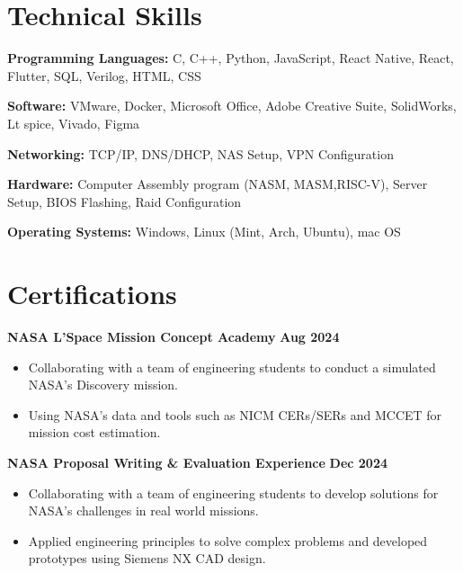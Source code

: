 \documentclass[letterpaper,11pt]{article}
\begin{document}
\section{Technical Skills}
\begin{itemize}[left=0.15in, label={}]
    \small{
    \item \textbf{Programming Languages:} C, C++, Python, JavaScript, React Native, React, Flutter, SQL, Verilog, HTML, CSS
    \item \textbf{Software:} VMware, Docker, Microsoft Office, Adobe Creative Suite, SolidWorks, Lt spice, Vivado, Figma
    \item \textbf{Networking:} TCP/IP, DNS/DHCP, NAS Setup, VPN Configuration
    \item \textbf{Hardware:} Computer Assembly program (NASM, MASM,RISC-V), Server Setup, BIOS Flashing, Raid Configuration
    \item \textbf{Operating Systems:} Windows, Linux (Mint, Arch, Ubuntu), mac OS
    }
\end{itemize}

\section{Certifications}
\textbf{NASA L’Space Mission Concept Academy}  \hfill \textbf{Aug 2024} 
\begin{itemize}[leftmargin=0.15in, label={$\bullet$}]
    \item Collaborating with a team of engineering students to conduct a simulated NASA's Discovery mission.
    \item Using NASA's data and tools such as NICM CERs/SERs and MCCET for mission cost estimation.
  \end{itemize}
 \textbf {NASA Proposal Writing \& Evaluation Experience} \hfill \textbf{Dec 2024}
 \begin{itemize}[leftmargin=0.15in, label={$\bullet$}]
  \item Collaborating with a team of engineering students to develop solutions for NASA’s challenges in real world missions.
  \item Applied engineering principles to solve complex problems and developed prototypes using Siemens NX CAD design.
\end{itemize}
\end{document}

